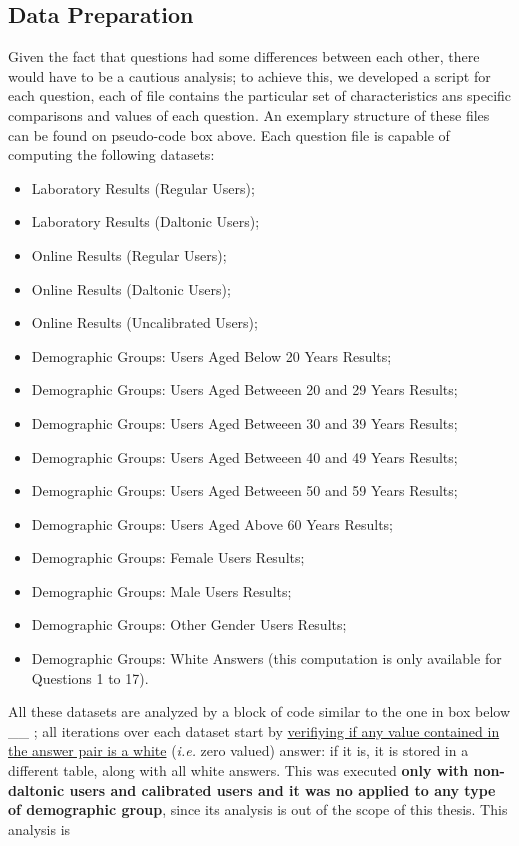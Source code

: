 \subsection{Data Preparation}
\label{subsec:results_preparation}
%
Given the fact that questions had some differences between each other, there would have to be a cautious analysis; to achieve this, we developed a script for each question, each of
file contains the particular set of characteristics ans specific comparisons and values of each question. An exemplary structure of these files can be found on pseudo-code box above.
Each question file is capable of computing the following datasets: \par
%
\begin{itemize}[noitemsep]
  \item Laboratory Results (Regular Users);
  \item Laboratory Results (Daltonic Users);
  \item Online Results (Regular Users);
  \item Online Results (Daltonic Users);
  \item Online Results (Uncalibrated Users);
  \item Demographic Groups: Users Aged Below 20 Years Results;
  \item Demographic Groups: Users Aged Betweeen 20 and 29 Years Results;
  \item Demographic Groups: Users Aged Betweeen 30 and 39 Years Results;
  \item Demographic Groups: Users Aged Betweeen 40 and 49 Years Results;
  \item Demographic Groups: Users Aged Betweeen 50 and 59 Years Results;
  \item Demographic Groups: Users Aged Above 60 Years Results;
  \item Demographic Groups: Female Users Results;
  \item Demographic Groups: Male Users Results;
  \item Demographic Groups: Other Gender Users Results;
  \item Demographic Groups: White Answers (this computation is only available for Questions 1 to 17).
\end{itemize} \par
%
All these datasets are analyzed by a block of code similar to the one in box below \_\_ ; all iterations over each dataset start by \ul{verifiying if any value contained in
the answer pair is a white} (\emph{i.e.} zero valued) answer: if it is, it is stored in a different table, along with all white answers. This was executed \textbf{only
with non-daltonic users and calibrated users and it was no applied to any type of demographic group}, since its analysis is out of the scope of this thesis. This analysis is
